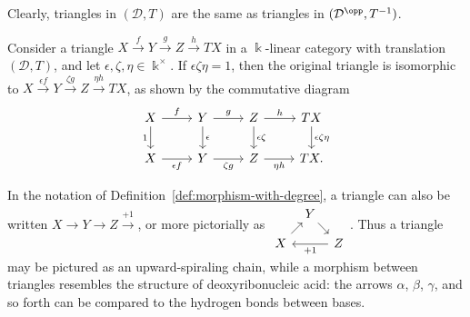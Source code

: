 Clearly, triangles in $(\mathcal{D},T)$ are the same as triangles in
$(\mathcal{D}^{\opp},T^{-1})$.

\begin{remark}\label{rem:triangle-signs}
	Consider a triangle
	$X\xrightarrow{f}Y\xrightarrow{g}Z\xrightarrow{h}TX$ in a
	$\Bbbk$-linear category with translation $(\mathcal{D},T)$, and let
	$\epsilon,\zeta,\eta\in\Bbbk^\times$. If
	$\epsilon\zeta\eta=1$, then the original triangle is isomorphic to
	$X\xrightarrow{\epsilon f}Y\xrightarrow{\zeta g}Z
	\xrightarrow{\eta h}TX$, as shown by the commutative diagram
	\[\begin{tikzcd}
		X \arrow[r,"f"] \arrow[d,"1"'] &
		Y \arrow[r,"g"] \arrow[d,"\epsilon"] &
		Z \arrow[r,"h"] \arrow[d,"\epsilon\zeta"] &
		TX \arrow[d,"\epsilon\zeta\eta"] \\
		X \arrow[r,"\epsilon f"'] & Y \arrow[r,"\zeta g"'] &
		Z \arrow[r,"\eta h"'] & TX.
	\end{tikzcd}\]
\end{remark}

In the notation of Definition~\ref{def:morphism-with-degree}, a triangle can
also be written $X\to Y\to Z\xrightarrow{+1}$, or more pictorially as
$\begin{tikzcd}[row sep=small,column sep=tiny]
	& Y \arrow[rd] & \\
	X \arrow[ru] & & Z \arrow[ll,"{+1}"]
\end{tikzcd}$.
Thus a triangle may be pictured as an upward-spiraling chain, while a
morphism between triangles resembles the structure of deoxyribonucleic acid:
the arrows $\alpha$, $\beta$, $\gamma$, and so forth can be compared to the
hydrogen bonds between bases.

